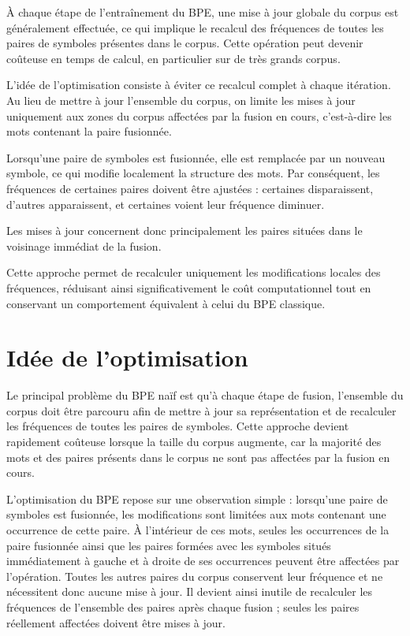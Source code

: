 \documentclass[12pt,a4paper]{report}
\begin{document}
	À chaque étape de l’entraînement du BPE, une mise à jour globale du corpus est généralement effectuée, ce qui implique le recalcul des fréquences de toutes les paires de symboles présentes dans le corpus. Cette opération peut devenir coûteuse en temps de calcul, en particulier sur de très grands corpus.
	
	L’idée de l’optimisation consiste à éviter ce recalcul complet à chaque itération. Au lieu de mettre à jour l’ensemble du corpus, on limite les mises à jour uniquement aux zones du corpus affectées par la fusion en cours, c’est-à-dire les mots contenant la paire fusionnée.
	
	Lorsqu’une paire de symboles est fusionnée, elle est remplacée par un nouveau symbole, ce qui modifie localement la structure des mots. Par conséquent, les fréquences de certaines paires doivent être ajustées : certaines disparaissent, d’autres apparaissent, et certaines voient leur fréquence diminuer.
	
	Les mises à jour concernent donc principalement les paires situées dans le voisinage immédiat de la fusion.
	
	Cette approche permet de recalculer uniquement les modifications locales des fréquences, réduisant ainsi significativement le coût computationnel tout en conservant un comportement équivalent à celui du BPE classique.
	
	
	\section{Idée de l'optimisation}
	
	Le principal problème du BPE naïf est qu’à chaque étape de fusion, l’ensemble du corpus doit être parcouru afin de mettre à jour sa représentation et de recalculer les fréquences de toutes les paires de symboles. Cette approche devient rapidement coûteuse lorsque la taille du corpus augmente, car la majorité des mots et des paires présents dans le corpus ne sont pas affectées par la fusion en cours.
	
	L’optimisation du BPE repose sur une observation simple : lorsqu’une paire de symboles est fusionnée, les modifications sont limitées aux mots contenant une occurrence de cette paire. À l’intérieur de ces mots, seules les occurrences de la paire fusionnée ainsi que les paires formées avec les symboles situés immédiatement à gauche et à droite de ses occurrences peuvent être affectées par l’opération. Toutes les autres paires du corpus conservent leur fréquence et ne nécessitent donc aucune mise à jour. Il devient ainsi inutile de recalculer les fréquences de l’ensemble des paires après chaque fusion ; seules les paires réellement affectées doivent être mises à jour.
	
\end{document}
